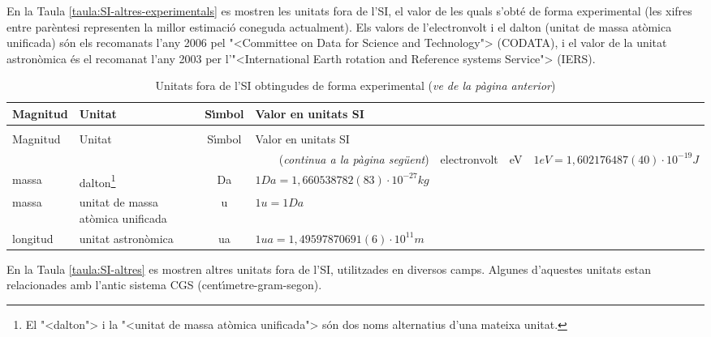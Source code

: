 En la Taula \vref{taula:SI-altres-experimentals} es mostren les unitats fora de l'SI, el valor de les quals s'obt\'{e} de forma experimental (les xifres entre par\`{e}ntesi representen la millor estimaci\'{o} coneguda actualment). Els valors de l'electronvolt i el dalton (unitat de massa at\`{o}mica unificada) s\'{o}n els recomanats
l'any 2006 pel {"<}Committee on Data for Science and Technology{">} (\textsf{CODATA}), i el valor de la unitat astron\`{o}mica \'{e}s el recomanat l'any 2003 per l'{"<}International Earth rotation and Reference systems Service{">} (\textsf{IERS}).

\begin{longtable}[h]{llcl}
   \caption{\label{taula:SI-altres-experimentals} Unitats fora de l'SI obtingudes de forma experimental }\\
   \toprule[1pt]
    Magnitud & Unitat &  S\'{\i}mbol & Valor en unitats SI\\
   \midrule
   \endfirsthead
   \caption[]{Unitats fora de l'SI obtingudes de forma experimental (\emph{ve de la p\`{a}gina
   anterior})}\\
   \toprule[1pt]
    Magnitud & Unitat &  S\'{\i}mbol & Valor en unitats SI\\
   \midrule
   \endhead
   \midrule
   \multicolumn{4}{r}{(\emph{continua a la p\`{a}gina seg\"{u}ent})}
   \endfoot
   \endlastfoot
   energia & electronvolt & \unit{eV} & $1\unit{eV} = 1{,}602176487(40)\cdot 10^{-19}\unit{J}$ \\
   massa & dalton\footnote{El {"<}dalton{">} i la {"<}unitat de massa at\`{o}mica unificada{">} s\'{o}n dos noms alternatius d'una mateixa unitat.}& Da & $1\unit{Da} = 1{,}660538782(83)\cdot 10^{-27}\unit{kg}$\\
   massa & unitat de massa at\`{o}mica unificada & u & $1\unit{u} = 1\unit{Da}$  \\
   longitud & unitat astron\`{o}mica &  \unit{ua }& $1\unit{ua} =  1{,}49597870691(6)\cdot 10^{11}\unit{m}$ \\
\bottomrule[1pt]
\end{longtable}


En la Taula \vref{taula:SI-altres} es mostren altres unitats fora de l'SI, utilitzades en diversos camps. Algunes d'aquestes unitats estan relacionades amb l'antic sistema CGS (cent\'{\i}metre-gram-segon).

